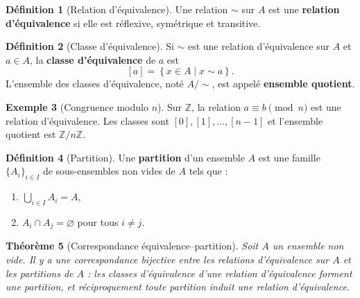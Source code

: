 \documentclass[12pt,a4paper,openany]{book}
\theoremstyle{definition}
\newtheorem{definition}{Définition}[chapter]
\newtheorem{exemple}[definition]{Exemple}
\theoremstyle{plain}
\newtheorem{theoreme}[definition]{Théorème}
\theoremstyle{remark}
\newcommand{\Z}{\mathbb{Z}}
\newcommand{\set}[1]{\left\{#1\right\}}
\begin{document}
\begin{definition}[Relation d'équivalence]\label{def:equivalence}
Une relation $\sim$ sur $A$ est une \textbf{relation d'équivalence} si elle
est réflexive, symétrique et transitive.
\end{definition}

\begin{definition}[Classe d'équivalence]\label{def:classe-equiv}
Si $\sim$ est une relation d'équivalence sur $A$ et $a \in A$, la
\textbf{classe d'équivalence} de $a$ est
\[
  [a] = \set{x \in A \mid x \sim a}.
\]
L'ensemble des classes d'équivalence, noté $A/{\sim}$, est appelé
\textbf{ensemble quotient}.
\end{definition}

\begin{exemple}[Congruence modulo $n$]\label{ex:congruence-equiv}
Sur $\Z$, la relation $a \equiv b \pmod{n}$ est une relation d'équivalence.
Les classes sont $[0], [1], \ldots, [n-1]$ et l'ensemble quotient est
$\Z/n\Z$.
\end{exemple}

\begin{definition}[Partition]\label{def:partition}
Une \textbf{partition} d'un ensemble $A$ est une famille
$\{A_i\}_{i \in I}$ de sous-ensembles non vides de $A$ tels que :
\begin{enumerate}
  \item $\displaystyle\bigcup_{i \in I} A_i = A$,
  \item $A_i \cap A_j = \varnothing$ pour tous $i \neq j$.
\end{enumerate}
\end{definition}

\begin{theoreme}[Correspondance équivalence--partition]\label{thm:equiv-partition}
Soit $A$ un ensemble non vide. Il y a une correspondance bijective entre
les relations d'équivalence sur $A$ et les partitions de $A$ : les classes
d'équivalence d'une relation d'équivalence forment une partition, et
réciproquement toute partition induit une relation d'équivalence.
\end{theoreme}
\end{document}
